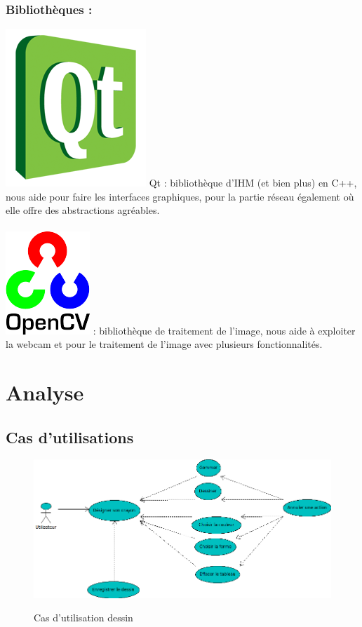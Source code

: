 \documentclass{report}
\begin{document}
			\subsubsection{Bibliothèques :}
			\includegraphics[scale=0.15]{../logos/qt_logo.png}
			Qt : bibliothèque d'IHM (et bien plus) en C++, nous aide pour faire les interfaces graphiques, pour la partie réseau également où elle offre des abstractions agréables. \\
			\paragraph{}
			\includegraphics[scale=1]{../logos/OpenCV_Logo.png}
			: bibliothèque de traitement de l'image, nous aide à exploiter la webcam et pour le traitement de l'image avec plusieurs fonctionnalités. \\
		
		\newpage
		\section{Analyse}
			\subsection{Cas d'utilisations}
				\begin{figure}[!h]
						\centering
						\includegraphics[scale=0.6]{../images/Dessin.png}\\
						\caption{Cas d'utilisation dessin}
						\label{Cas d'utilisation}
				\end{figure}
				
\end{document}
